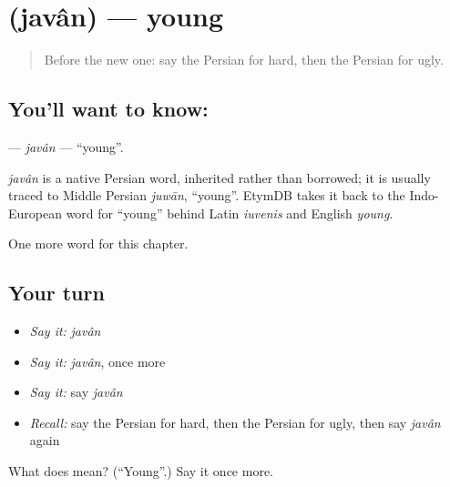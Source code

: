 \section[\texorpdfstring{\fa{جوان} (javân)}{جوان (javân)}]{ (javân) — young}

\label{lesson:FA-C125-javan}



\begin{quote}
Before the new one: say the Persian for hard, then the Persian for ugly.
\end{quote}

\subsection*{You'll want to know: }
\textbf{} — \emph{javân} — \textquotedblleft{}young\textquotedblright{}.

\begin{cousinweb}
\emph{javân} is a native Persian word, inherited rather than borrowed; it is usually traced to Middle Persian \emph{juwān}, \textquotedblleft{}young\textquotedblright{}. EtymDB takes it back to the Indo-European word for \textquotedblleft{}young\textquotedblright{} behind Latin \emph{iuvenis} and English \emph{young}.
\end{cousinweb}

\begin{grammarlens}[title={What you've built}]
One more word for this chapter.
\end{grammarlens}

\subsection*{Your turn}
\begin{itemize}
\raggedright
  \item \emph{Say it:} \emph{javân}
  \item \emph{Say it:} \emph{javân}, once more
  \item \emph{Say it:} say \emph{javân}
  \item \emph{Recall:} say the Persian for hard, then the Persian for ugly, then say \emph{javân} again
\end{itemize}

\begin{tcolorbox}[breakable,colback=teal!4,colframe=teal!35!black,title={Before you move on}]
What does  mean? (\textquotedblleft{}Young\textquotedblright{}.) Say it once more.
\end{tcolorbox}
